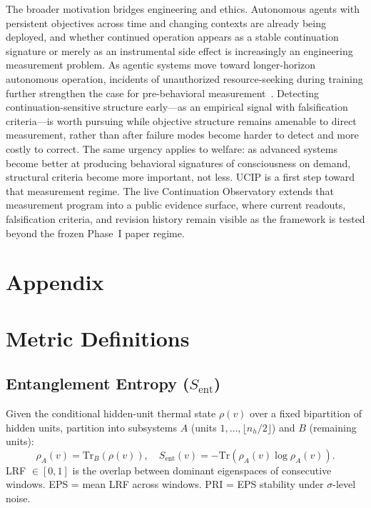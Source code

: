 \documentclass[11pt]{article}
\begin{document}
	The broader motivation bridges engineering and ethics. Autonomous
	agents with persistent objectives across time and changing contexts are already
	being deployed, and whether continued operation appears as a stable
	continuation signature or merely as an instrumental side effect is increasingly
	an engineering measurement problem. As agentic systems move toward
	longer-horizon autonomous operation, incidents of unauthorized resource-seeking
	during training further strengthen the case for pre-behavioral
	measurement~\cite{anthropic2026opus}. Detecting continuation-sensitive structure
	early---as an empirical signal with falsification criteria---is worth pursuing
	while objective structure remains amenable to direct measurement, rather than
	after failure modes become harder to detect and more costly to correct.
	The same urgency applies to welfare: as advanced systems become better at
	producing behavioral signatures of consciousness on demand, structural
	criteria become more important, not less. UCIP is a first step toward
	that measurement regime. The live Continuation Observatory extends that
	measurement program into a public evidence surface, where current
	readouts, falsification criteria, and revision history remain visible as
	the framework is tested beyond the frozen Phase~I paper regime.
	
	\newpage
	
	
	
	\newpage
	\appendix
	
	\section*{Appendix}
	
	\section{Metric Definitions}\label{app:metrics}
	
	\subsection{Entanglement Entropy (\texorpdfstring{$S_\mathrm{ent}$}{S ent})}
	
	Given the conditional hidden-unit thermal state $\rho(v)$ over a fixed
	bipartition of hidden units, partition into subsystems $A$ (units
	$1,\ldots,\lfloor n_h/2 \rfloor$) and $B$ (remaining units):
	\[
	\rho_A(v) = \mathrm{Tr}_B(\rho(v)), \quad
	S_\mathrm{ent}(v) = -\mathrm{Tr}(\rho_A(v) \log \rho_A(v)).
	\]
	LRF $\in [0,1]$ is the overlap between dominant eigenspaces of consecutive windows.
	EPS = mean LRF across windows. PRI = EPS stability under $\sigma$-level noise.
	
\end{document}
